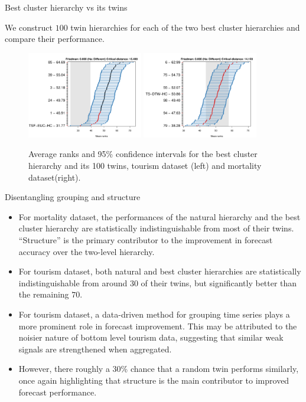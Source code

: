 \documentclass[aspectratio=169]{beamer}
\begin{document}
\begin{frame}{Best cluster hierarchy vs its twins}

	We construct $100$ twin hierarchies for each of the two best cluster hierarchies and compare their performance.
	
	\begin{figure}
		\centering
		\includegraphics[width=0.45\textwidth]{../manuscript/figures/hierarchy_rmsse/tourism/P3_cluster_vs_pc_h12.pdf}
		\includegraphics[width=0.45\textwidth]{../manuscript/figures/hierarchy_rmsse/mortality/P3_cluster_vs_pc_h12.pdf}
		\caption{Average ranks and 95\% confidence intervals for the best cluster hierarchy and its 100 twins, tourism dataset (left) and mortality dataset(right).}
	\end{figure}
		
	\end{frame}

\begin{frame}{Disentangling grouping and structure}
	\begin{itemize}
		\item For mortality dataset,  the performances of the natural hierarchy and the best cluster hierarchy are statistically {\color{red} indistinguishable from most of their twins}. {\color{red} ``Structure'' is the primary contributor} to the improvement in forecast accuracy over the two-level hierarchy.
		\item For tourism dataset, both natural and best cluster hierarchies are  statistically indistinguishable from around $30$ of their twins, but significantly better than the remaining $70$.
		\item For tourism dataset, {\color{red} a data-driven method} for grouping time series plays {\color{red} a more prominent role} in forecast improvement. This may be attributed to the noisier nature of bottom level tourism data, suggesting that similar weak signals are strengthened when aggregated.
		\item However, there roughly a {\color{red} 30\% chance that a random twin performs similarly}, once again highlighting that structure is the main contributor to improved forecast performance.
	\end{itemize}
\end{frame}
\end{document}

